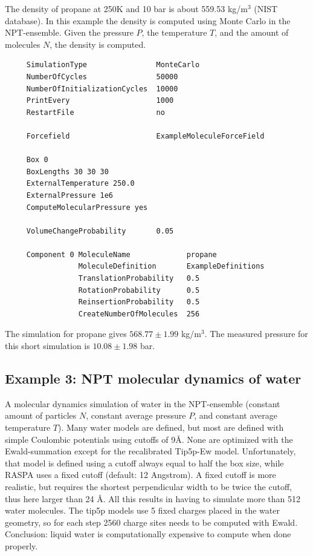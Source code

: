 The density of propane at 250K and 10 bar is about 559.53 kg/m$^3$ (NIST database). In this example the density is
computed using Monte Carlo in the NPT-ensemble. Given the pressure $P$, the temperature $T$, and the amount of molecules $N$,
the density is computed.

\begin{tiny}
\begin{verbatim}
     SimulationType                MonteCarlo
     NumberOfCycles                50000
     NumberOfInitializationCycles  10000
     PrintEvery                    1000
     RestartFile                   no
     
     Forcefield                    ExampleMoleculeForceField
     
     Box 0
     BoxLengths 30 30 30
     ExternalTemperature 250.0
     ExternalPressure 1e6
     ComputeMolecularPressure yes
     
     VolumeChangeProbability       0.05
     
     Component 0 MoleculeName             propane
                 MoleculeDefinition       ExampleDefinitions
                 TranslationProbability   0.5
                 RotationProbability      0.5
                 ReinsertionProbability   0.5
                 CreateNumberOfMolecules  256
\end{verbatim}
\end{tiny}
The simulation for propane gives $568.77\pm 1.99$ kg/m$^3$.
The measured pressure for this short simulation is $10.08\pm1.98$ bar.


\subsection*{Example 3: NPT molecular dynamics of water}
A molecular dynamics simulation of water in the NPT-ensemble
(constant amount of particles $N$, constant average pressure $P$, and constant average temperature $T$).
Many water models are defined, but most are defined with simple Coulombic potentials using cutoffs of 9\AA.
None are optimized with the Ewald-summation except for the recalibrated Tip5p-Ew model.
Unfortunately, that model is defined using a cutoff always equal to half the box size, while
RASPA uses a fixed cutoff (default: 12 Angstrom). A fixed cutoff is more realistic, but requires the shortest
perpendicular width to be twice the cutoff, thus here larger than 24 \AA. All this results in having
to simulate more than 512 water molecules. The tip5p models use 5 fixed charges placed in the water geometry,
so for each step 2560 charge sites needs to be computed with Ewald. Conclusion: liquid water is computationally
expensive to compute when done properly.

